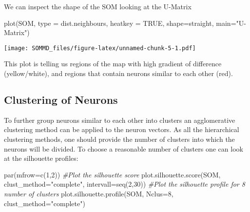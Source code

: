 \documentclass[
]{article}
\newenvironment{Shaded}{\begin{snugshade}}{\end{snugshade}}
\newcommand{\AttributeTok}[1]{\textcolor[rgb]{0.77,0.63,0.00}{#1}}
\newcommand{\CommentTok}[1]{\textcolor[rgb]{0.56,0.35,0.01}{\textit{#1}}}
\newcommand{\ConstantTok}[1]{\textcolor[rgb]{0.00,0.00,0.00}{#1}}
\newcommand{\DecValTok}[1]{\textcolor[rgb]{0.00,0.00,0.81}{#1}}
\newcommand{\FunctionTok}[1]{\textcolor[rgb]{0.00,0.00,0.00}{#1}}
\newcommand{\NormalTok}[1]{#1}
\newcommand{\StringTok}[1]{\textcolor[rgb]{0.31,0.60,0.02}{#1}}
\begin{document}
We can inspect the shape of the SOM looking at the U-Matrix

\begin{Shaded}
\begin{Highlighting}[]
\FunctionTok{plot}\NormalTok{(SOM, }\AttributeTok{type =} \StringTok{\textquotesingle{}dist.neighbours\textquotesingle{}}\NormalTok{, }\AttributeTok{heatkey =} \ConstantTok{TRUE}\NormalTok{, }\AttributeTok{shape=}\StringTok{\textquotesingle{}straight\textquotesingle{}}\NormalTok{, }\AttributeTok{main=}\StringTok{"U{-}Matrix"}\NormalTok{)}
\end{Highlighting}
\end{Shaded}

\texttt{[image: SOMMD\_files/figure-latex/unnamed-chunk-5-1.pdf]}

This plot is telling us regions of the map with high gradient of
difference (yellow/white), and regions that contain neurons similar to
each other (red).

\hypertarget{clustering-of-neurons}{%
\subsection{Clustering of Neurons}\label{clustering-of-neurons}}

To further group neurons similar to each other into clusters an
agglomerative clustering method can be applied to the neuron vectors. As
all the hierarchical clustering methods, one should provide the number
of clusters into which the neurons will be divided. To choose a
reasonable number of clusters one can look at the silhouette profiles:

\begin{Shaded}
\begin{Highlighting}[]
\FunctionTok{par}\NormalTok{(}\AttributeTok{mfrow=}\FunctionTok{c}\NormalTok{(}\DecValTok{1}\NormalTok{,}\DecValTok{2}\NormalTok{))}
\CommentTok{\#Plot the silhouette score}
\FunctionTok{plot.silhouette.score}\NormalTok{(SOM, }\AttributeTok{clust\_method=}\StringTok{"complete"}\NormalTok{, }\AttributeTok{intervall=}\FunctionTok{seq}\NormalTok{(}\DecValTok{2}\NormalTok{,}\DecValTok{30}\NormalTok{))}
\CommentTok{\#Plot the silhouette profile for 8 number of clusters}
\FunctionTok{plot.silhouette.profile}\NormalTok{(SOM, }\AttributeTok{Nclus=}\DecValTok{8}\NormalTok{, }\AttributeTok{clust\_method=}\StringTok{"complete"}\NormalTok{)}
\end{Highlighting}
\end{Shaded}
\end{document}
